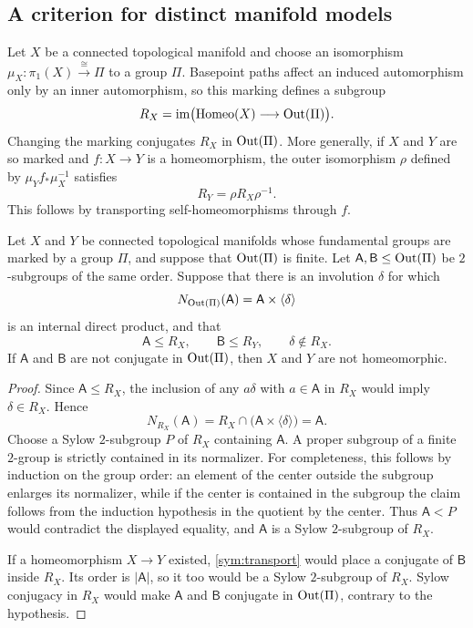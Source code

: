 \subsection{A criterion for distinct manifold models}

Let $X$ be a connected topological manifold and choose an isomorphism
$\mu_X:\pi_1(X)\xrightarrow{\cong}\Pi$ to a group $\Pi$.  Basepoint
paths affect an induced automorphism only by an inner automorphism, so
this marking defines a subgroup
\[
 R_X=\operatorname{im}\bigl(\operatorname{Homeo}(X)
                  \longrightarrow\operatorname{Out}(\Pi)\bigr).
\]
Changing the marking conjugates $R_X$ in $\operatorname{Out}(\Pi)$.  More generally,
if $X$ and $Y$ are so marked and $f:X\to Y$ is a homeomorphism, the
outer isomorphism $\rho$ defined by $\mu_Y f_*\mu_X^{-1}$ satisfies
\begin{equation}\label{sym:transport}
 R_Y=\rho R_X\rho^{-1}.
\end{equation}
This follows by transporting self-homeomorphisms through $f$.

\begin{proposition}
\label{sym:criterion}
Let $X$ and $Y$ be connected topological manifolds whose fundamental
groups are marked by a group $\Pi$, and suppose that $\operatorname{Out}(\Pi)$ is
finite.  Let $\mathsf A,\mathsf B\leq\operatorname{Out}(\Pi)$ be $2$-subgroups of
the same order.  Suppose that there is an involution $\delta$ for which
\[
 N_{\operatorname{Out}(\Pi)}(\mathsf A)=\mathsf A\times\langle\delta\rangle
\]
is an internal direct product, and that
\[
 \mathsf A\leq R_X,\qquad \mathsf B\leq R_Y,
 \qquad \delta\notin R_X.
\]
If $\mathsf A$ and $\mathsf B$ are not conjugate in $\operatorname{Out}(\Pi)$, then
$X$ and $Y$ are not homeomorphic.
\end{proposition}

\begin{proof}
Since $\mathsf A\leq R_X$, the inclusion of any $a\delta$ with
$a\in\mathsf A$ in $R_X$ would imply $\delta\in R_X$.  Hence
\[
 N_{R_X}(\mathsf A)
 =R_X\cap\bigl(\mathsf A\times\langle\delta\rangle\bigr)
 =\mathsf A.
\]
Choose a Sylow $2$-subgroup $P$ of $R_X$ containing $\mathsf A$.
A proper subgroup of a finite $2$-group is strictly contained in its
normalizer.  For completeness, this follows by induction on the group
order: an element of the center outside the subgroup enlarges its
normalizer, while if the center is contained in the subgroup the claim
follows from the induction hypothesis in the quotient by the center.
Thus $\mathsf A<P$ would contradict the displayed equality, and
$\mathsf A$ is a Sylow $2$-subgroup of $R_X$.

If a homeomorphism $X\to Y$ existed, \eqref{sym:transport} would place
a conjugate of $\mathsf B$ inside $R_X$.  Its order is $|\mathsf A|$,
so it too would be a Sylow $2$-subgroup of $R_X$.  Sylow conjugacy in
$R_X$ would make $\mathsf A$ and $\mathsf B$ conjugate in $\operatorname{Out}(\Pi)$,
contrary to the hypothesis.
\end{proof}
